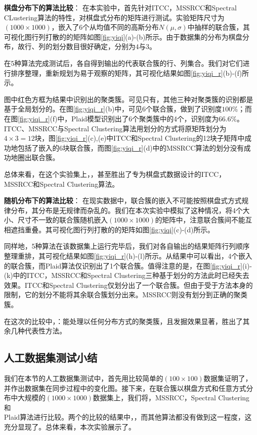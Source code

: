 \vspace{3mm}
\textbf{棋盘分布下的算法比较}：
在本实验中，首先针对ITCC，MSSRCC和Spectral CLustering算法的特性，对棋盘式分布的矩阵进行测试。实验矩阵尺寸为$(1000\times1000)$，嵌入了6个从均值不同的高斯分布$N(\mu,\sigma)$中抽样的联合簇，其可视化图行列打散的的矩阵如图\ref{fig:yiqi}(a)-(b)所示。由于数据集的分布为棋盘分布，故行、列的划分数目很好确定，分别为$4$与$3$。

在5种算法完成测试后，各自得到输出的代表联合簇的行、列集合。我们对它们进行排序整理，重新规划为易于观察的矩阵，其可视化结果如图\ref{fig:yiqi_r}(b)-(f)所示。

图中红色方框为结果中识别出的聚类簇。可见只有，其他三种对聚类簇的识别都是基于全局划分的。在图\ref{fig:yiqi_r}(b)中，可见6个联合簇，做到了识别度$100\%$；而在图\ref{fig:yiqi_r}(f)中，Plaid模型识别出了6个聚类簇中的4个，识别度为$66.6\%$。ITCC、MSSRCC与Spectral Clustering算法用划分的方式将原矩阵划分为$4\times3=12$块，图\ref{fig:yiqi_r}(c),(e)中ITCC和Spectral Clustering的12块子矩阵中成功地包括了嵌入的6块联合簇，而图\ref{fig:yiqi_r}(d)中的MSSRCC算法的划分没有成功地圈出联合簇。

总体来看，在这个实验集上，，甚至胜出了专为棋盘式数据设计的ITCC，MSSRCC和Spectral Clustering算法。

\vspace{3mm}
\textbf{随机分布下的算法比较}：
在现实数据中，联合簇的嵌入不可能按照棋盘式方式规律分布，其分布是无规律而杂乱的。我们在本次实验中模拟了这种情况，将4个大小、尺寸不一致的联合簇随机嵌入$(1000\times1000)$的矩阵中，注意联合簇间不能互相遮挡重叠。其可视化图行列打散的的矩阵如图\ref{fig:yiqi}(c)-(d)所示。

同样地，5种算法在该数据集上运行完毕后，我们对各自输出的结果矩阵行列顺序整理重排，其可视化结果如图\ref{fig:yiqi_r}(h)-(l)所示。从结果中可以看出，4个嵌入的联合簇，而Plaid算法仅识别出了1个联合簇。值得注意的是，在图\ref{fig:yiqi_r}(i)-(k)中的ITCC，MSSRCC和Spectral Clustering三种基于划分的方法此时已经失去效果。ITCC和Spectral Clustering仅划分出了一个联合簇。但由于受于方法本身的限制，它的划分不能将其余联合簇划分出来。MSSRCC则没有划分到正确的聚类簇。

在这次的比较中，：能处理以任何分布方式的聚类簇，且发掘效果显著，胜出了其余几种代表性方法。

\subsection{人工数据集测试小结}
我们在本节的人工数据集测试中，首先用比较简单的$(100\times100)$数据集证明了，并作出数据集在同步过程中的变化图。接下来，在联合簇以棋盘方式和任意方式分布中大规模的$(1000\times1000)$数据集上，我们将，MSSRCC，Spectral Clustering和\\Plaid算法进行比较。两个的比较的结果中，，而其他算法都没有做到这一程度，这充分显现了。总体来看，本次实验展示了。

